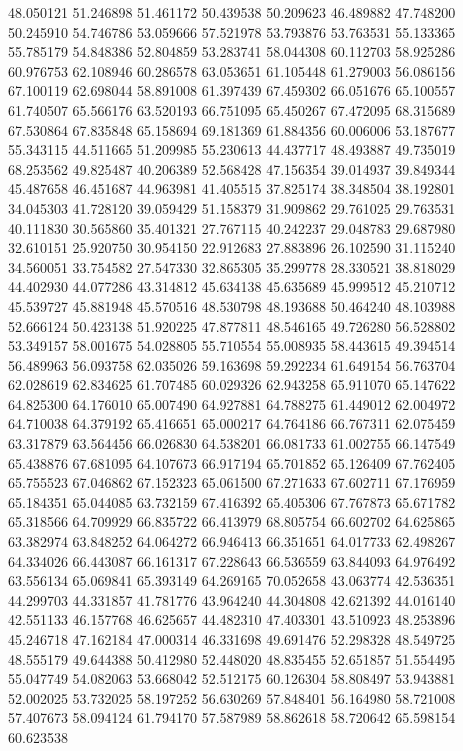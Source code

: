 48.050121
51.246898
51.461172
50.439538
50.209623
46.489882
47.748200
50.245910
54.746786
53.059666
57.521978
53.793876
53.763531
55.133365
55.785179
54.848386
52.804859
53.283741
58.044308
60.112703
58.925286
60.976753
62.108946
60.286578
63.053651
61.105448
61.279003
56.086156
67.100119
62.698044
58.891008
61.397439
67.459302
66.051676
65.100557
61.740507
65.566176
63.520193
66.751095
65.450267
67.472095
68.315689
67.530864
67.835848
65.158694
69.181369
61.884356
60.006006
53.187677
55.343115
44.511665
51.209985
55.230613
44.437717
48.493887
49.735019
68.253562
49.825487
40.206389
52.568428
47.156354
39.014937
39.849344
45.487658
46.451687
44.963981
41.405515
37.825174
38.348504
38.192801
34.045303
41.728120
39.059429
51.158379
31.909862
29.761025
29.763531
40.111830
30.565860
35.401321
27.767115
40.242237
29.048783
29.687980
32.610151
25.920750
30.954150
22.912683
27.883896
26.102590
31.115240
34.560051
33.754582
27.547330
32.865305
35.299778
28.330521
38.818029
44.402930
44.077286
43.314812
45.634138
45.635689
45.999512
45.210712
45.539727
45.881948
45.570516
48.530798
48.193688
50.464240
48.103988
52.666124
50.423138
51.920225
47.877811
48.546165
49.726280
56.528802
53.349157
58.001675
54.028805
55.710554
55.008935
58.443615
49.394514
56.489963
56.093758
62.035026
59.163698
59.292234
61.649154
56.763704
62.028619
62.834625
61.707485
60.029326
62.943258
65.911070
65.147622
64.825300
64.176010
65.007490
64.927881
64.788275
61.449012
62.004972
64.710038
64.379192
65.416651
65.000217
64.764186
66.767311
62.075459
63.317879
63.564456
66.026830
64.538201
66.081733
61.002755
66.147549
65.438876
67.681095
64.107673
66.917194
65.701852
65.126409
67.762405
65.755523
67.046862
67.152323
65.061500
67.271633
67.602711
67.176959
65.184351
65.044085
63.732159
67.416392
65.405306
67.767873
65.671782
65.318566
64.709929
66.835722
66.413979
68.805754
66.602702
64.625865
63.382974
63.848252
64.064272
66.946413
66.351651
64.017733
62.498267
64.334026
66.443087
66.161317
67.228643
66.536559
63.844093
64.976492
63.556134
65.069841
65.393149
64.269165
70.052658
43.063774
42.536351
44.299703
44.331857
41.781776
43.964240
44.304808
42.621392
44.016140
42.551133
46.157768
46.625657
44.482310
47.403301
43.510923
48.253896
45.246718
47.162184
47.000314
46.331698
49.691476
52.298328
48.549725
48.555179
49.644388
50.412980
52.448020
48.835455
52.651857
51.554495
55.047749
54.082063
53.668042
52.512175
60.126304
58.808497
53.943881
52.002025
53.732025
58.197252
56.630269
57.848401
56.164980
58.721008
57.407673
58.094124
61.794170
57.587989
58.862618
58.720642
65.598154
60.623538
